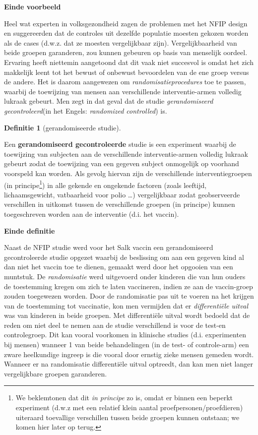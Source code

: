\documentclass[
  12pt,dutch,coursenotes]{book}
\theoremstyle{definition}
\newtheorem{definition}{Definitie}[chapter]
\theoremstyle{definition}
\theoremstyle{definition}
\theoremstyle{remark}
\begin{document}
\textbf{Einde voorbeeld}

Heel wat experten in volksgezondheid zagen de problemen met het NFIP design
en suggereerden dat de controles uit dezelfde populatie moesten gekozen
worden als de cases (d.w.z. dat ze moesten vergelijkbaar zijn).
Vergelijkbaarheid van beide groepen garanderen, zou kunnen gebeuren op basis
van menselijk oordeel. Ervaring heeft niettemin aangetoond dat dit vaak niet
succesvol is omdat het zich makkelijk leent tot het bewust of onbewust
bevoordelen van de ene groep versus de andere. Het is daarom aangewezen om
\emph{randomisatieprocedures} toe te passen, waarbij de toewijzing van
mensen aan verschillende interventie-armen volledig lukraak gebeurt. Men
zegt in dat geval dat de studie \emph{gerandomiseerd gecontroleerd}(in
het Engels: \emph{randomized controlled}) is.

\begin{definition}[gerandomiseerde studie]
\protect\hypertarget{def:unnamed-chunk-69}{}{\label{def:unnamed-chunk-69} \iffalse (gerandomiseerde studie) \fi{} }
\end{definition}
Een \textbf{gerandomiseerd gecontroleerde} studie is een experiment waarbij
de toewijzing van subjecten aan de verschillende interventie-armen volledig
lukraak gebeurt zodat de toewijzing van een gegeven subject onmogelijk op
voorhand voorspeld kan worden. Als gevolg hiervan zijn de verschillende
interventiegroepen (in principe\footnote{We beklemtonen dat dit \emph{in principe} zo is, omdat er binnen een beperkt experiment (d.w.z met een relatief klein aantal proefpersonen/proefdieren) uiteraard toevallige verschillen tussen beide groepen kunnen ontstaan; we komen hier later op terug.}) in alle gekende en ongekende factoren (zoals
leeftijd, lichaamsgewicht, vatbaarheid voor polio \ldots) vergelijkbaar zodat
geobserveerde verschillen in uitkomst tussen de verschillende groepen (in
principe) kunnen toegeschreven worden aan de interventie (d.i. het vaccin).

\textbf{Einde definitie}

Naast de NFIP studie werd voor het Salk vaccin een gerandomiseerd
gecontroleerde studie opgezet waarbij de beslissing om aan een gegeven kind
al dan niet het vaccin toe te dienen, gemaakt werd door het opgooien van een
muntstuk. De \emph{randomisatie} werd uitgevoerd onder kinderen die van
hun ouders de toestemming kregen om zich te laten vaccineren, indien ze aan de
vaccin-groep zouden toegewezen worden. Door de randomisatie pas uit te
voeren na het krijgen van de toestemming tot vaccinatie, kon men vermijden
dat er \emph{differentiële uitval} was van kinderen in beide
groepen. Met differentiële uitval wordt bedoeld dat de reden om niet
deel te nemen aan de studie verschillend is voor de test-en controlegroep.
Dit kan vooral voorkomen in klinische studies (d.i. experimenten bij mensen)
wanneer 1 van beide behandelingen (in de test- of
controle-arm) een zware heelkundige ingreep is die vooral door ernstig zieke
mensen gemeden wordt. Wanneer er na randomisatie differentiële uitval
optreedt, dan kan men niet langer vergelijkbare groepen garanderen.
\end{document}
